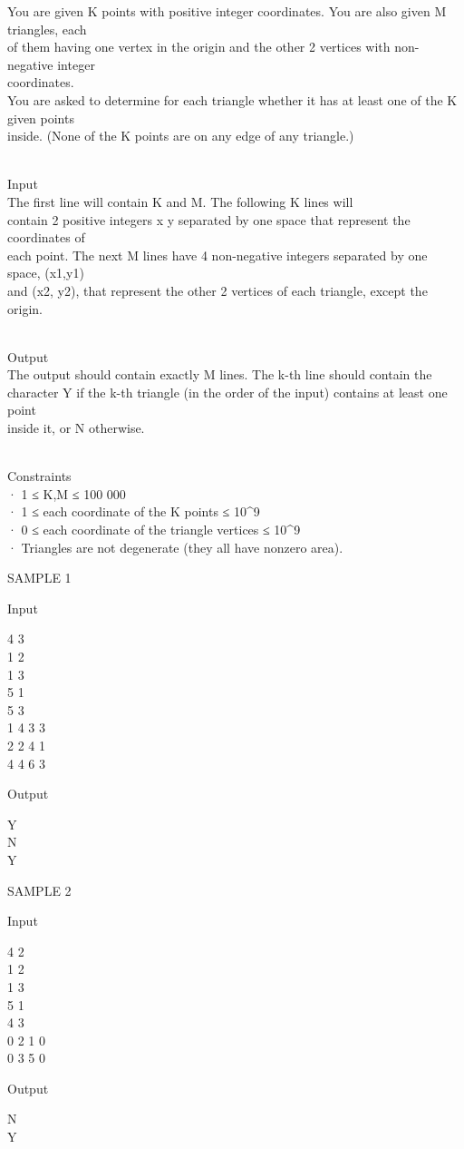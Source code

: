 



   You are given K points with positive integer coordinates. You are also given M triangles, each   
\\   of them having one vertex in the origin and the other 2 vertices with non-negative integer   
\\   coordinates.   
\\   You are asked to determine for each triangle whether it has at least one of the K given points   
\\   inside. (None of the K points are on any edge of any triangle.)  


\\   Input   
\\   The first line will contain K and M. The following K lines will   
\\   contain 2 positive integers x y separated by one space that represent the coordinates of   
\\   each point. The next M lines have 4 non-negative integers separated by one space, (x1,y1)   
\\   and (x2, y2), that represent the other 2 vertices of each triangle, except the origin.  


\\   Output   
\\   The output should contain exactly M lines. The k-th line should contain the   
\\   character Y if the k-th triangle (in the order of the input) contains at least one point   
\\   inside it, or N otherwise.  


\\   Constraints   
\\   · 1 ≤ K,M ≤ 100 000   
\\   · 1 ≤ each coordinate of the K points ≤ 10^9   
\\   · 0 ≤ each coordinate of the triangle vertices ≤ 10^9   
\\   · Triangles are not degenerate (they all have nonzero area).  

   SAMPLE 1  

   Input  

   4 3   
\\   1 2   
\\   1 3   
\\   5 1   
\\   5 3   
\\   1 4 3 3   
\\   2 2 4 1   
\\   4 4 6 3  

   Output  

   Y   
\\   N   
\\   Y  

   SAMPLE 2  

   Input  

   4 2   
\\   1 2   
\\   1 3   
\\   5 1   
\\   4 3   
\\   0 2 1 0   
\\   0 3 5 0  

   Output  

   N   
\\   Y  
